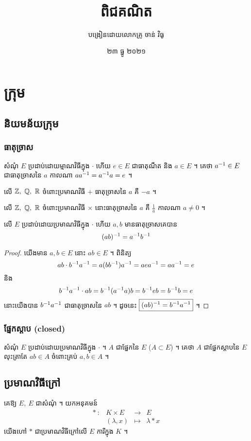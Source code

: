 

\title{ពិជគណិត}
\author{បង្រៀនដោយលោកគ្រូ ចាន់ វិធូ}
\date{២៣ ធ្នូ ២០២១}



\chapter{ក្រុម}

\section{និយមន័យក្រុម}

\subsection{ធាតុច្រាស}
សំណុំ $E$ ប្រដាប់ដោយម្មាណវិធីក្នុង $\cdot$ ហើយ $e\in E$ ជាធាតុណឺត និង
$a\in E$ ។ គេថា $a^{-1}\in E$ ជាធាតុច្រាសនៃ $a$ កាលណា $aa^{-1} = a^{-1} a=e$ ។
\begin{example}
លើ $\mathbb{Z},~\mathbb{Q},~\mathbb{R}$ ចំពោះប្រមាណវិធី $+$ ធាតុច្រាសនៃ $a$ គឺ $-a$ ។
\end{example}
\begin{example}
លើ $\mathbb{Z},~\mathbb{Q},~\mathbb{R}$ ចំពោះប្រមាណវិធី $\times$ នោះធាតុច្រាសនៃ $a$ គឺ $\frac{1}{a}$
កាលណា $a\neq 0$ ។
\end{example}
\begin{theorem}
លើ $E$ ប្រដាប់ដោយប្រមាណវិធីក្នុង $\cdot$ ហើយ $a,b$ មានធាតុច្រាសគេបាន
\[(ab)^{-1}=a^{-1} b^{-1}\]
\end{theorem}
\begin{proof}
យើងមាន  $a,b\in E$ នោះ $ab\in E$ ។ ពិនិត្យ
\[ab\cdot b^{-1} a^{-1}=a (bb^{-1}) a^{-1}=aea^{-1}=aa^{-1}=e\] 
និង
\[b^{-1} a^{-1}\cdot ab=b^{-1} (a^{-1} a)b=b^{-1} eb=b^{-1} b=e\]
នោះយើងបាន $b^{-1} a^{-1}$ ជាធាតុច្រាសនៃ $ab$ ។ 
ដូចនេះ $\boxed{(ab)^{-1} = b^{-1} a^{-1}}$ ។
\end{proof}

\subsection{ផ្នែកស្តាប (closed)}
សំណុំ $E$ ប្រដាប់ដោយប្រមាណវិធីក្នុង $\cdot$ ។ $A$ ជាផ្នែកនៃ $E$ ($A\subset E$) ។
គេថា $A$ ជាផ្នែកស្តាបនៃ $E$ លុះត្រាតែ $ab\in A$ ចំពោះគ្រប់ $a,b\in A$ ។

\section{ប្រមាណវិធីក្រៅ}
គេឱ្យ $E,~E$ ជាសំណុំ ។ យកអនុគមន៍
\[
\begin{array}{lrll}
\ast ~: & K\times E &\to & E\\
     & (\lambda, x) &\mapsto & \lambda\ast x
\end{array}
\]
យើងហៅ $\ast$ ជាប្រមាណវិធីក្រៅលើ $E$ ការីក្នុង $K$ ។

